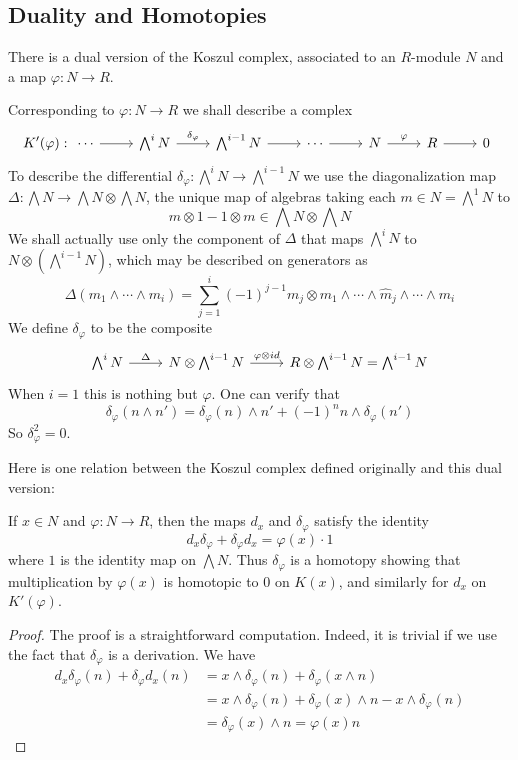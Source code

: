 \subsection{Duality and Homotopies}
There is a dual version of the Koszul complex, associated to an $R$-module
$N$ and a map $\varphi:N\to R$.\par
Corresponding to $\varphi:N\to R$ we shall describe a complex
\[K'(\varphi):\begin{tikzcd}
\cdots\ar[r]&\bigwedge^iN\ar[r,"\delta_\varphi"]&\bigwedge^{i-1}N\ar[r]&\cdots\ar[r]&N\ar[r,"\varphi"]&R\ar[r]&0
\end{tikzcd}\]
To describe the differential $\delta_\varphi:\bigwedge^iN\to\bigwedge^{i-1}N$ we use the diagonalization
map $\Delta:\bigwedge N\to\bigwedge N\otimes\bigwedge N$, the unique map of algebras taking each $m\in N=\bigwedge^1N$ to
\[m\otimes 1-1\otimes m\in\bigwedge N\otimes\bigwedge N\]
We shall actually use only the component of $\Delta$ that maps $\bigwedge^i N$ to $N\otimes(\bigwedge^{i-1}N)$, which may be described on generators as
\[\Delta(m_1\wedge\cdots\wedge m_i)=\sum_{j=1}^{i}(-1)^{j-1}m_j\otimes m_1\wedge\cdots\wedge\widehat{m}_j\wedge\cdots\wedge m_i\]
We define $\delta_\varphi$ to be the composite
\[\begin{tikzcd}
\bigwedge^iN\ar[r,"\Delta"]&N\otimes\bigwedge^{i-1}N\ar[r,"\varphi\otimes id"]&R\otimes\bigwedge^{i-1}N=\bigwedge^{i-1}N
\end{tikzcd}\]
When $i=1$ this is nothing but $\varphi$. One can verify that
\[\delta_\varphi(n\wedge n')=\delta_\varphi(n)\wedge n'+(-1)^nn\wedge\delta_\varphi(n')\]
So $\delta_\varphi^2=0$.\par
Here is one relation between the Koszul complex defined originally and
this dual version:
\begin{proposition}
If $x\in N$ and $\varphi:N\to R$, then the maps $d_x$ and $\delta_\varphi$ satisfy the identity
\[d_x\delta_\varphi+\delta_\varphi d_x=\varphi(x)\cdot 1\]
where $1$ is the identity map on $\bigwedge N$. Thus $\delta_\varphi$ is a homotopy showing that multiplication by $\varphi(x)$ is homotopic to $0$ on $K(x)$, and similarly for $d_x$ on $K'(\varphi)$.
\end{proposition}
\begin{proof}
The proof is a straightforward computation. Indeed, it is trivial if we use the fact that $\delta_\varphi$ is a derivation. We have
\begin{align*}
d_x\delta_\varphi(n)+\delta_\varphi d_x(n)&=x\wedge\delta_\varphi(n)+\delta_\varphi(x\wedge n)\\
&=x\wedge\delta_\varphi(n)+\delta_\varphi(x)\wedge n-x\wedge\delta_\varphi(n)\\
&=\delta_\varphi(x)\wedge n=\varphi(x)n
\end{align*}
\end{proof}
